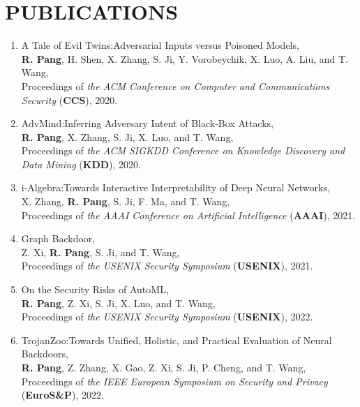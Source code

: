 \documentclass[letterpaper,11pt]{article}
\begin{document}
\section{PUBLICATIONS}

\begin{enumerate}[labelsep=15pt, parsep=-4pt]

    \item A Tale of Evil Twins:\@ Adversarial Inputs versus Poisoned Models,\\
    \textbf{R. Pang}, H. Shen, X. Zhang, S. Ji, Y. Vorobeychik, X. Luo, A. Liu, and T. Wang,\\
    Proceedings of {\it the ACM Conference on Computer and Communications Security\/} (\textbf{CCS}), 2020.
    
    \item AdvMind:\@ Inferring Adversary Intent of Black-Box Attacks,\\
    \textbf{R. Pang}, X. Zhang, S. Ji, X. Luo, and T. Wang,\\
    Proceedings of {\it the ACM SIGKDD Conference on Knowledge Discovery and Data Mining\/} (\textbf{KDD}), 2020.
    
    \item i-Algebra:\@ Towards Interactive Interpretability of Deep Neural Networks,\\
    X. Zhang, \textbf{R. Pang}, S. Ji, F. Ma, and T. Wang,\\
    Proceedings of {\it the AAAI Conference on Artificial Intelligence\/} (\textbf{AAAI}), 2021.
    
    \item Graph Backdoor,\\
    Z. Xi, \textbf{R. Pang}, S. Ji, and T. Wang,\\
    Proceedings of {\it the USENIX Security Symposium\/} (\textbf{USENIX}), 2021.
    
    \item On the Security Risks of AutoML,\\
    \textbf{R. Pang}, Z. Xi, S. Ji, X. Luo, and T. Wang,\\
    Proceedings of {\it the USENIX Security Symposium\/} (\textbf{USENIX}), 2022.
    
    \item TrojanZoo:\@ Towards Unified, Holistic, and Practical Evaluation of Neural Backdoors,\\
    \textbf{R. Pang}, Z. Zhang, X. Gao, Z. Xi, S. Ji, P. Cheng, and T. Wang,\\
    Proceedings of {\it the IEEE European Symposium on Security and Privacy\/} (\textbf{EuroS\&P}), 2022.
    

\end{enumerate}
\end{document}
